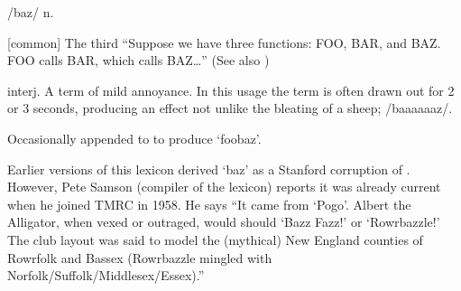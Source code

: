  /baz/ n.

\begin{inparaenum}
    \item {[}common] The third  ``Suppose we
        have three functions: FOO, BAR, and BAZ. FOO calls BAR, which calls
        BAZ\ldots'' (See also )
    \item interj. A term of mild annoyance. In this usage the term is often
        drawn out for 2 or 3 seconds, producing an effect not unlike the
        bleating of a sheep; /baaaaaaz/.
    \item Occasionally appended to  to produce `foobaz'.
\end{inparaenum}

Earlier versions of this lexicon derived `baz' as a Stanford corruption of
. However, Pete Samson (compiler of the  lexicon)
reports it was already current when he joined TMRC in 1958. He says ``It came
from `Pogo'. Albert the Alligator, when vexed or outraged, would should `Bazz
Fazz!' or `Rowrbazzle!' The club layout was said to model the (mythical) New
England counties of Rowrfolk and Bassex (Rowrbazzle mingled with
Norfolk/Suffolk/Middlesex/Essex).''

